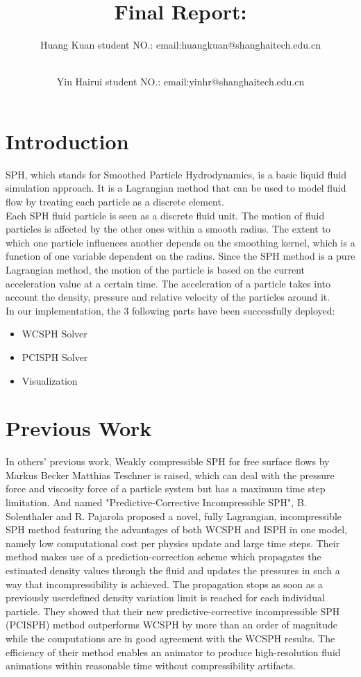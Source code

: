 \documentclass[acmtog]{acmart}
\title{Final Report:\\ {}}
\author{Huang Kuan \quad student NO.:\quad 2020533123
	\quad email:\quad huangkuan@shanghaitech.edu.cn}
\author{\\Yin Hairui \quad student NO.:\quad 2020533028
	\quad email:\quad yinhr@shanghaitech.edu.cn}
\begin{document}
\maketitle

\vspace*{2 ex}

\section{Introduction}
SPH, which stands for Smoothed Particle Hydrodynamics, is a basic liquid fluid simulation approach. It is a Lagrangian method that can be used to model fluid flow by treating each particle as a discrete element. \\
Each SPH fluid particle is seen as a discrete fluid unit. The motion of fluid particles is affected by the other ones within a smooth radius. The extent to which one particle influences another depends on the smoothing kernel, which is a function of one variable dependent on the radius. Since the SPH method is a pure Lagrangian method, the motion of the particle is based on the current acceleration value at a certain time. The acceleration of a particle takes into account the density, pressure and relative velocity of the particles around it. \\
In our implementation, the 3 following parts have been successfully deployed:
\begin{itemize}
\item WCSPH Solver
\item PCISPH Solver
\item Visualization
\end{itemize}

\section{Previous Work}
In others' previous work, Weakly compressible SPH for free surface flows by Markus Becker Matthias Teschner is raised, which can deal with the pressure force and viscosity force of a particle system but has a maximum time step limitation.
And named "Predictive-Corrective Incompressible SPH", B. Solenthaler and R. Pajarola proposed a novel, fully Lagrangian, incompressible SPH method featuring the advantages of both WCSPH and ISPH in one model, namely low computational cost per physics update and large time steps. Their method makes use of a prediction-correction scheme which propagates the estimated density values through the fluid and updates the pressures in such a way that incompressibility is achieved. The propagation stops as soon as a previously userdefined density variation limit is reached for each individual particle. They showed that their new predictive-corrective incompressible SPH (PCISPH) method outperforms WCSPH by more than an order of magnitude while the computations are in good agreement with the WCSPH results. The efficiency of their method enables an animator to produce high-resolution fluid animations within reasonable time without compressibility artifacts.
\end{document}
